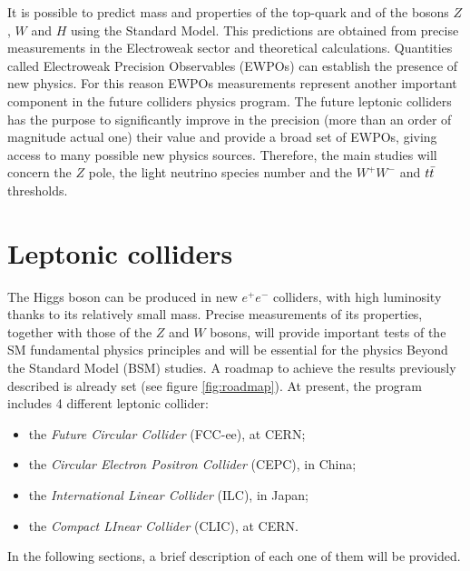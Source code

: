 It is possible to predict mass and properties of the top-quark and of the bosons $Z$, $W$ and $H$ using the Standard Model. This predictions are obtained from precise measurements in the Electroweak sector and theoretical calculations.
Quantities called Electroweak Precision Observables (EWPOs) can establish the presence of new physics. For this reason EWPOs measurements represent another important component in the future colliders physics program.
The future leptonic colliders has the purpose to significantly improve in the precision (more than an order of magnitude actual one) their value and provide a broad set of EWPOs, giving access to many possible new physics sources.
Therefore, the main  studies will concern the $Z$ pole, the light neutrino species number and the $W^+W^-$ and $t\Bar{t}$ thresholds.

\section{Leptonic colliders}\label{sec:Coll-ee}

The Higgs boson can be produced in new $e^+e^-$ colliders, with high luminosity thanks to its relatively small mass.
Precise measurements of its properties, together with those of the $Z$ and $W$ bosons, will provide important tests of the SM fundamental physics principles and will be essential for the physics Beyond the Standard Model (BSM) studies.
A roadmap to achieve the results previously described is already set (see figure \ref{fig:roadmap}).
At present, the program includes 4 different leptonic collider:
\begin{itemize}
    \item the \textit{Future Circular Collider} (FCC-ee), at CERN;
    \item the \textit{Circular Electron Positron Collider} (CEPC), in China;
    \item the \textit{International Linear Collider} (ILC), in Japan;
    \item the \textit{Compact LInear Collider} (CLIC), at CERN.
\end{itemize}
In the following sections, a brief description of each one of them will be provided.

